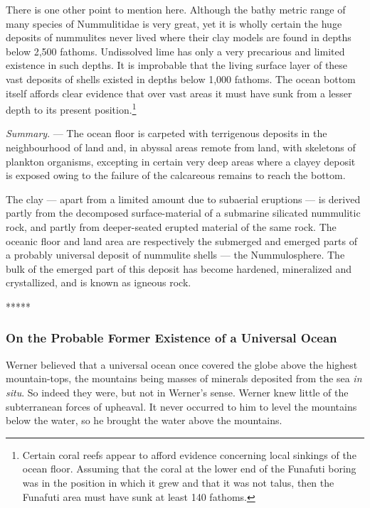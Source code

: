 \documentclass[a4paper, 12pt, oneside]{article}
\begin{document}
There is one other point to mention here. Although the bathy metric range of many species of Nummulitidae is very great, yet it is wholly certain the huge deposits of nummulites never lived where their clay models are found in depths below 2,500 fathoms. Undissolved lime has only a very precarious and limited existence in such depths. It is improbable that the living surface layer of these vast deposits of shells existed in depths below 1,000 fathoms. The ocean bottom itself affords clear evidence that over vast areas it must have sunk from a lesser depth to its present position.\footnote{Certain coral reefs appear to afford evidence concerning local sinkings of the ocean floor. Assuming that the coral at the lower end of the Funafuti boring was in the position in which it grew and that it was not talus, then the Funafuti area must have sunk at least 140 fathoms.} 

\emph{Summary}. --- The ocean floor is carpeted with terrigenous deposits in the neighbourhood of land and, in abyssal areas remote from land, with skeletons of plankton organisms, excepting in certain very deep areas where a clayey deposit is exposed owing to the failure of the calcareous remains to reach the bottom.

The clay --- apart from a limited amount due to subaerial eruptions --- is derived partly from the decomposed surface-material of a submarine silicated nummulitic rock, and partly from deeper-seated erupted material of the same rock. The oceanic floor and land area are respectively the submerged and emerged parts of a probably universal deposit of nummulite shells --- the Nummulosphere. The bulk of the emerged part of this deposit has become hardened, mineralized and crystallized, and is known as igneous rock.

\centerline{*\hspace{15mm}*\hspace{15mm}*\hspace{15mm}*\hspace{15mm}*}
\bigskip
\subsubsection{On the Probable Former Existence of a Universal Ocean}

Werner believed that a universal ocean once covered the globe above the highest mountain-tops, the mountains being masses of minerals deposited from the sea \emph{in situ}. So indeed they were, but not in Werner's sense. Werner knew little of the subterranean forces of upheaval. It never occurred to him to level the mountains below the water, so he brought the water above the mountains.
\end{document}
